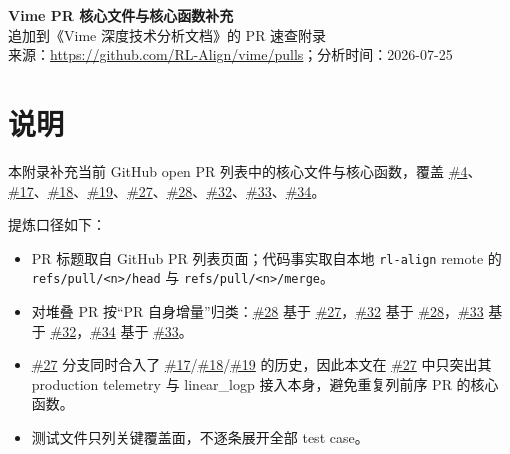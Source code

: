 \documentclass[11pt,a4paper]{ctexart}
\newcommand{\code}[1]{{\small\nolinkurl{#1}}}
\newcommand{\pr}[1]{\href{https://github.com/RL-Align/vime/pull/#1}{\##1}}
\begin{document}
\begin{center}
  {\Huge\bfseries Vime PR 核心文件与核心函数补充}\\[6pt]
  {\large 追加到《Vime 深度技术分析文档》的 PR 速查附录}\\[4pt]
  {\small 来源：\url{https://github.com/RL-Align/vime/pulls}；分析时间：2026-07-25}
\end{center}

\section{说明}
本附录补充当前 GitHub open PR 列表中的核心文件与核心函数，覆盖 \pr{4}、\pr{17}、\pr{18}、\pr{19}、\pr{27}、\pr{28}、\pr{32}、\pr{33}、\pr{34}。

提炼口径如下：
\begin{itemize}
  \item PR 标题取自 GitHub PR 列表页面；代码事实取自本地 \code{rl-align} remote 的 \code{refs/pull/<n>/head} 与 \code{refs/pull/<n>/merge}。
  \item 对堆叠 PR 按“PR 自身增量”归类：\pr{28} 基于 \pr{27}，\pr{32} 基于 \pr{28}，\pr{33} 基于 \pr{32}，\pr{34} 基于 \pr{33}。
  \item \pr{27} 分支同时合入了 \pr{17}/\pr{18}/\pr{19} 的历史，因此本文在 \pr{27} 中只突出其 production telemetry 与 linear\_logp 接入本身，避免重复列前序 PR 的核心函数。
  \item 测试文件只列关键覆盖面，不逐条展开全部 test case。
\end{itemize}
\end{document}

